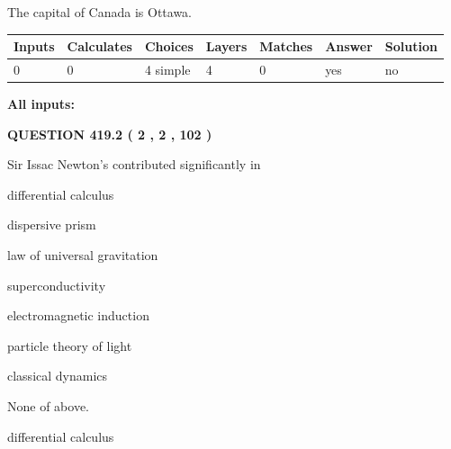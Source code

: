 \documentclass[12pt]{article}
\begin{document}
 
The capital of Canada is Ottawa.
 
 
\noindent{}
 
 
   
   
   
   
\noindent\begin{tabular}{|l|l|l|l|l|l|l|}
 \hline
Inputs & Calculates & Choices & Layers & Matches & Answer & Solution \\ \hline
 0  & 
 0  & 
 4
  simple  
  & 
 4  & 
 0  & 
  yes & 
  no 
  \\ \hline
 \end{tabular}
   
   
   
   
\noindent{}
   
   
   
   
\noindent\vspace{0.1in}\hspace{-0.08in} {\textbf{\Large{All inputs: }}}
   
   
  
\vspace{0.2in}
  
{\textbf{\Large{QUESTION
419.2 
 ( 2 , 2 , 102 )
}}}
  
  
Sir Issac Newton's contributed significantly in
 
 
differential calculus
 
 
dispersive prism
 
 
law of universal gravitation
 
 
superconductivity
 
 
electromagnetic induction
 
 
particle theory of light
 
 
classical dynamics
 
 
 None of above.
 
 
\noindent{}
 
 
differential calculus
 
\end{document}
